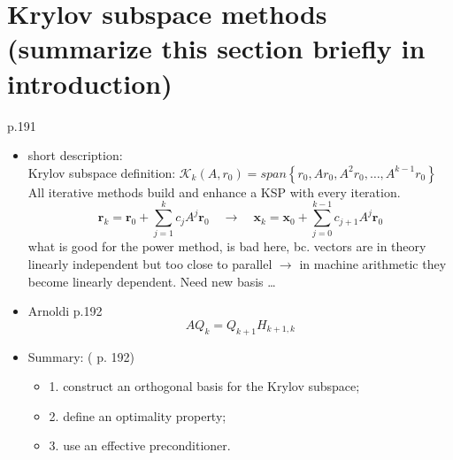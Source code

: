 \documentclass{scrartcl}
\numberwithin{equation}{section}
\begin{document}
\section*{Krylov subspace methods (summarize this section briefly in introduction)}

\cite{Ascher:2011:FCN:2031413} p.191\\
\begin{itemize}
\item short description:\\
Krylov subspace definition: $\mathcal{K}_k(A, r_0) = span \left\{ r_0, Ar_0, A^2r_0,\ldots,A^{k-1}r_0 \right\}$\\

All iterative methods build and enhance a KSP with every iteration.
\begin{equation*}
\textbf{r}_k = \textbf{r}_0 + \sum_{j=1}^{k} c_jA^j\textbf{r}_0 \quad \to \quad \textbf{x}_k = \textbf{x}_0 + \sum_{j=0}^{k-1} c_{j+1}A^j\textbf{r}_0
\end{equation*}
what is good for the power method, is bad here, bc. vectors are in theory linearly independent but too close to parallel $\to$ in machine arithmetic they become linearly dependent. Need new basis \ldots 
\item Arnoldi \cite{Ascher:2011:FCN:2031413} p.192
\begin{equation*}
AQ_k = Q_{k+1}H_{k+1,k}
\end{equation*}
\item Summary: (\cite{Ascher:2011:FCN:2031413} p. 192)
	\begin{itemize}
	\item 1. construct an orthogonal basis for the Krylov subspace;
	\item 2. define an optimality property;
	\item 3. use an effective preconditioner.
	\end{itemize}
\end{itemize}
\end{document}
